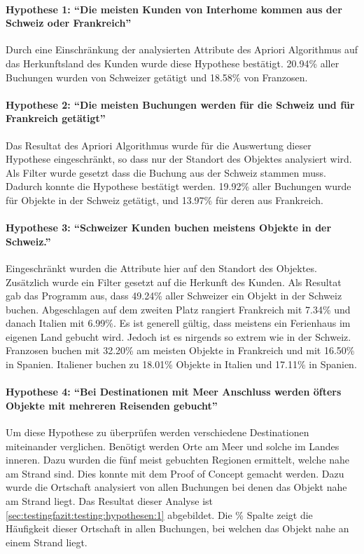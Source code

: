 \paragraph{Hypothese 1: "`Die meisten Kunden von Interhome kommen aus der Schweiz oder Frankreich"'} Durch eine Einschränkung der analysierten Attribute des Apriori Algorithmus auf das Herkunftsland des Kunden wurde diese Hypothese bestätigt. 20.94\% aller Buchungen wurden von Schweizer getätigt und 18.58\% von Franzosen. 
\paragraph{Hypothese 2: "`Die meisten Buchungen werden für die Schweiz und für Frankreich getätigt"'} Das Resultat des Apriori Algorithmus wurde für die Auswertung dieser Hypothese eingeschränkt, so dass nur der Standort des Objektes analysiert wird. Als Filter wurde gesetzt dass die Buchung aus der Schweiz stammen muss. Dadurch konnte die Hypothese bestätigt werden. 19.92\% aller Buchungen wurde für Objekte in der Schweiz getätigt, und 13.97\% für deren aus Frankreich.
\paragraph{Hypothese 3: "`Schweizer Kunden buchen meistens Objekte in der Schweiz."'} Eingeschränkt wurden die Attribute hier auf den Standort des Objektes. Zusätzlich wurde ein Filter gesetzt auf die Herkunft des Kunden. Als Resultat gab das Programm aus, dass 49.24\% aller Schweizer ein Objekt in der Schweiz buchen. Abgeschlagen auf dem zweiten Platz rangiert Frankreich mit 7.34\% und danach Italien mit 6.99\%. Es ist generell gültig, dass meistens ein Ferienhaus im eigenen Land gebucht wird. Jedoch ist es nirgends so extrem wie in der Schweiz. Franzosen buchen mit 32.20\% am meisten Objekte in Frankreich und mit 16.50\% in Spanien. Italiener buchen zu 18.01\% Objekte in Italien und 17.11\% in Spanien.
\paragraph{Hypothese 4: "`Bei Destinationen mit Meer Anschluss werden öfters Objekte mit mehreren Reisenden gebucht"'} Um diese Hypothese zu überprüfen werden verschiedene Destinationen miteinander verglichen. Benötigt werden Orte am Meer und solche im Landes inneren. Dazu wurden die fünf meist gebuchten Regionen ermittelt, welche nahe am Strand sind. Dies konnte mit dem Proof of Concept gemacht werden. Dazu wurde die Ortschaft analysiert von allen Buchungen bei denen das Objekt nahe am Strand liegt. Das Resultat dieser Analyse ist \cref{sec:testingfazit:testing:hypothesen:1} abgebildet. Die \% Spalte zeigt die Häufigkeit dieser Ortschaft in allen Buchungen, bei welchen das Objekt nahe an einem Strand liegt.

